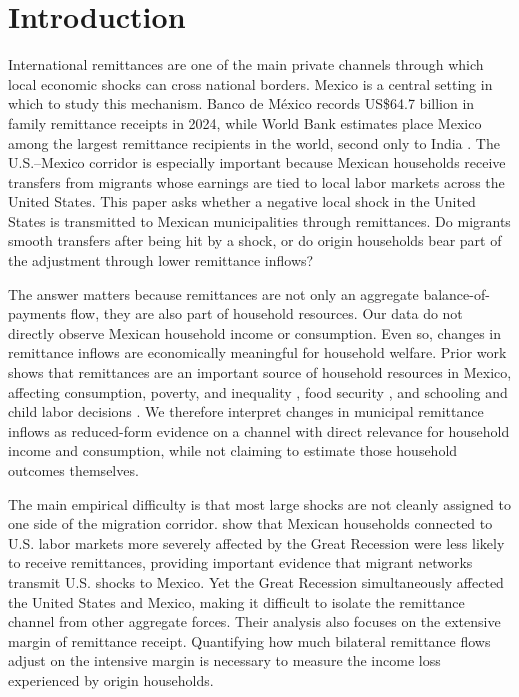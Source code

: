 \chapter{Introduction}

International remittances are one of the main private channels through which local economic shocks can cross national borders. Mexico is a central setting in which to study this mechanism. Banco de M{\'e}xico records US\$64.7 billion in family remittance receipts in 2024, while World Bank estimates place Mexico among the largest remittance recipients in the world, second only to India \parencite{banxico_remittances_ca11, worldbank_remittances}. The U.S.--Mexico corridor is especially important because Mexican households receive transfers from migrants whose earnings are tied to local labor markets across the United States. This paper asks whether a negative local shock in the United States is transmitted to Mexican municipalities through remittances. Do migrants smooth transfers after being hit by a shock, or do origin households bear part of the adjustment through lower remittance inflows?

The answer matters because remittances are not only an aggregate balance-of-payments flow, they are also part of household resources. Our data do not directly observe Mexican household income or consumption. Even so, changes in remittance inflows are economically meaningful for household welfare. Prior work shows that remittances are an important source of household resources in Mexico, affecting consumption, poverty, and inequality \parencite{adamsetal2005}, food security \parencite{MORARIVERA2021105349}, and schooling and child labor decisions \parencite{ALCARAZ2012156}. We therefore interpret changes in municipal remittance inflows as reduced-form evidence on a channel with direct relevance for household income and consumption, while not claiming to estimate those household outcomes themselves.

The main empirical difficulty is that most large shocks are not cleanly assigned to one side of the migration corridor. \textcite{caballero_2023} show that Mexican households connected to U.S. labor markets more severely affected by the Great Recession were less likely to receive remittances, providing important evidence that migrant networks transmit U.S. shocks to Mexico. Yet the Great Recession simultaneously affected the United States and Mexico, making it difficult to isolate the remittance channel from other aggregate forces. Their analysis also focuses on the extensive margin of remittance receipt. Quantifying how much bilateral remittance flows adjust on the intensive margin is necessary to measure the income loss experienced by origin households.

